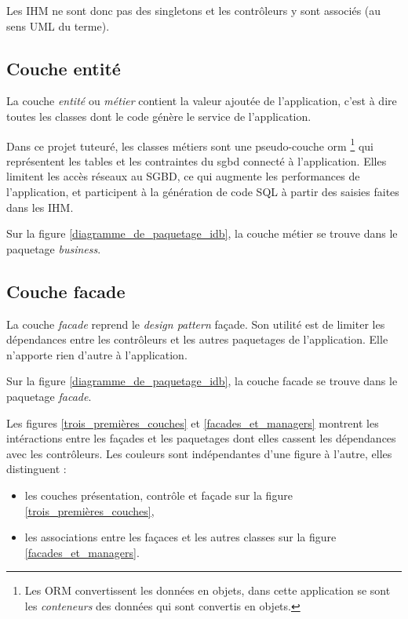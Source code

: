 Les IHM ne sont donc pas des singletons et les contrôleurs y sont associés (au sens UML du terme).

\subsection{Couche entité}
La couche \textit{entité} ou \textit{métier} contient la valeur ajoutée de l'application, c'est à dire toutes les classes dont le code génère le service de l'application.

Dans ce projet tuteuré, les classes métiers sont une pseudo-couche \gls{orm}
\footnote{\label{faux_orm}Les ORM convertissent les données en objets, dans cette application se sont les \textit{conteneurs} des données qui sont convertis en objets.}
qui représentent les tables et les contraintes du \gls{sgbd} connecté à l'application.
Elles limitent les accès réseaux au SGBD, ce qui augmente les performances de l'application, et participent à la génération de code SQL à partir des saisies faites dans les IHM.

Sur la figure \ref{diagramme_de_paquetage_idb}, la couche métier se trouve dans le paquetage \textit{business}.

\subsection{Couche facade}
La couche \textit{facade} reprend le \textit{design pattern} façade.
Son utilité est de limiter les dépendances entre les contrôleurs et les autres paquetages de l'application.
Elle n'apporte rien d'autre à l'application.

Sur la figure \ref{diagramme_de_paquetage_idb}, la couche facade se trouve dans le paquetage \textit{facade}.

Les figures \ref{trois_premières_couches} et \ref{facades_et_managers} montrent les intéractions entre les façades et les paquetages dont elles cassent les dépendances avec les contrôleurs. Les couleurs sont indépendantes d'une figure à l'autre, elles distinguent :
\begin{itemize}
\item les couches présentation, contrôle et façade sur la figure \ref{trois_premières_couches},
\item les associations entre les façaces et les autres classes sur la figure \ref{facades_et_managers}.
\end{itemize}

